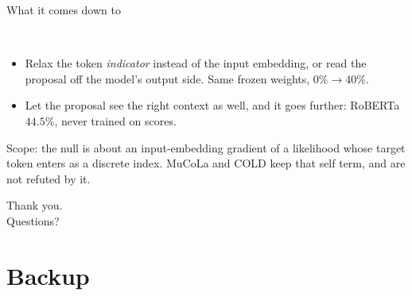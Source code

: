 \documentclass{beamer}
\begin{document}
\begin{frame}{What it comes down to}
  \vspace{1.0em}
  \begin{center}
  \Large{}\\[0.3em]
  \Large{}
  \end{center}
  \vspace{1.2em}
  \begin{itemize}\small
    \item Relax the token \emph{indicator} instead of the input embedding, or read the proposal
      off the model's output side. Same frozen weights, $0\% \to 40\%$.
    \item Let the proposal see the right context as well, and it goes further:
      RoBERTa $44.5\%$, never trained on scores.
  \end{itemize}
  \vspace{1.0em}
  \begin{center}
  {\footnotesize\color{gray!80} Scope: the null is about an input-embedding gradient of a
  likelihood whose target token enters as a discrete index. MuCoLa and COLD keep that self term,
  and are not refuted by it.}
  \end{center}
\end{frame}

\begin{frame}[plain]
  \begin{center}
  \Large Thank you.\\[0.6em]
  \normalsize Questions?
  \end{center}
\end{frame}

\appendix
\section*{Backup}

\appendix

\end{document}
